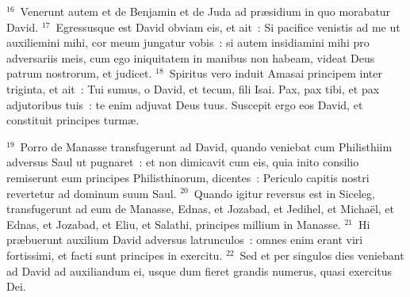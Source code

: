 ${}^{16}$~Venerunt autem et de Benjamin et de Juda ad pr\ae sidium in quo morabatur David.
${}^{17}$~Egressusque est David obviam eis, et ait~: Si pacifice venistis ad me ut auxiliemini mihi, cor meum jungatur vobis~: si autem insidiamini mihi pro adversariis meis, cum ego iniquitatem in manibus non habeam, videat Deus patrum nostrorum, et judicet.
${}^{18}$~Spiritus vero induit Amasai principem inter triginta, et ait~: Tui sumus, o David, et tecum, fili Isai. Pax, pax tibi, et pax adjutoribus tuis~: te enim adjuvat Deus tuus. Suscepit ergo eos David, et constituit principes turm\ae .


${}^{19}$~Porro de Manasse transfugerunt ad David, quando veniebat cum Philisthiim adversus Saul ut pugnaret~: et non dimicavit cum eis, quia inito consilio remiserunt eum principes Philisthinorum, dicentes~: Periculo capitis nostri revertetur ad dominum suum Saul.
${}^{20}$~Quando igitur reversus est in Siceleg, transfugerunt ad eum de Manasse, Ednas, et Jozabad, et Jedihel, et Micha\"el, et Ednas, et Jozabad, et Eliu, et Salathi, principes millium in Manasse.
${}^{21}$~Hi pr\ae buerunt auxilium David adversus latrunculos~: omnes enim erant viri fortissimi, et facti sunt principes in exercitu.
${}^{22}$~Sed et per singulos dies veniebant ad David ad auxiliandum ei, usque dum fieret grandis numerus, quasi exercitus Dei.


